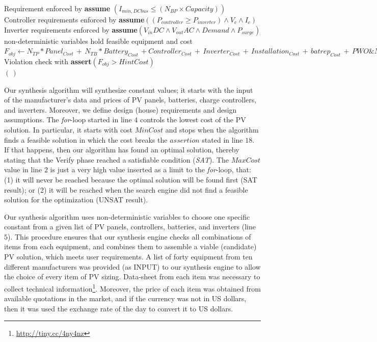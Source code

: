 \documentclass[journal]{IEEEtran}
\begin{document}
\begin{algorithm}
\begin{algorithmic}[1]
\begin{scriptsize}
	\STATE Requirement enforced by \textbf{assume} $(I_{min,DCbus} \leq (N_{BP} \times Capacity))$ \\
 	\STATE Controller requirements enforced by \textbf{assume}$((P_{controller} \geq P_{inverter}) \wedge V_{c} \wedge I_{c})$ \\
	\STATE Inverter requirements enforced by \textbf{assume}$(V_{in}DC \wedge V_{out}AC \wedge Demand \wedge P_{surge})$ \\
	\STATE non-deterministic variables hold feasible equipment and cost \\
	\STATE $F_{obj} \leftarrow N_{TP}*Panel_{Cost} \, + \, N_{TB}*Battery_{Cost} \, + Controller_{Cost} \, + \, Inverter_{Cost} \, + \, Installation_{Cost} \, + \, batrep_{Cost} \, + \, PWO\&M_{Cost}$ \\
	\STATE Violation check with \textbf{assert}$(F_{obj} > HintCost)$ \\
 \ENDFOR
 \RETURN $(\,)$ 
 \end{scriptsize}
 \end{algorithmic} 
 \label{alg:verification-algorithm}
 \end{algorithm}

Our synthesis algorithm will synthesize constant values; it starts with the input of the manufacturer's data and prices of PV panels, batteries, charge controllers, and inverters. Moreover, we define design (house) requirements and design assumptions. 
%
The \textit{for}-loop started in line $4$ controls the lowest cost of the PV solution. In particular, it starts with cost $MinCost$ and stops when the algorithm finds a feasible solution in which the cost breaks the $assertion$ stated in line $18$. If that happens, then our algorithm has found an optimal solution, thereby stating that the {\sc Verify} phase reached a satisfiable condition (\textit{SAT}). The $MaxCost$ value in line $2$ is just a very high value inserted as a limit to the \textit{for}-loop, that: (1) it will never be reached because the optimal solution will be found first (SAT result); or (2) it will be reached when the search engine did not find a feasible solution for the optimization (UNSAT result).

Our synthesis algorithm uses non-deterministic variables to choose one specific constant from a given list of PV panels, controllers, batteries, and inverters (line $5$). This procedure ensures that our synthesis engine checks all combinations of items from each equipment, and combines them to assemble a viable (candidate) PV solution, which meets user requirements. A list of forty equipment from ten different manufacturers was provided (as INPUT) to our synthesis engine to allow the choice of every item of PV sizing. Data-sheet from each item was necessary to collect technical information\footnote{\url{http://tiny.cc/4ny4nz}}. Moreover, the price of each item was obtained from available quotations in the market, and if the currency was not in US dollars, then it was used the exchange rate of the day to convert it to US dollars. %
\end{document}
